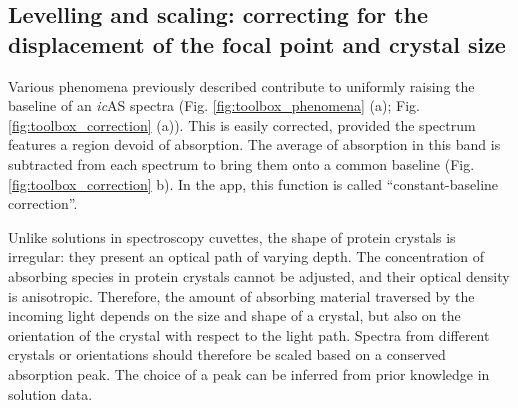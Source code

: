 \subsection{Levelling and scaling: correcting for the displacement of the focal point and crystal size}

Various phenomena previously described contribute to uniformly raising the baseline of an \textit{ic}AS spectra (Fig. \ref{fig:toolbox_phenomena} (a); Fig. \ref{fig:toolbox_correction} (a)). This is easily corrected, provided the spectrum features a region devoid of absorption. The average of absorption in this band is subtracted from each spectrum to bring them onto a common baseline (Fig. \ref{fig:toolbox_correction} b). In the app, this function is called “constant-baseline correction”. 


Unlike solutions in spectroscopy cuvettes, the shape of protein crystals is irregular: they present an optical path of varying depth. The concentration of absorbing species in protein crystals cannot be adjusted, and their optical density is anisotropic. Therefore, the amount of absorbing material traversed by the incoming light depends on the size and shape of a crystal, but also on the orientation of the crystal with respect to the light path. Spectra from different crystals or orientations should therefore be scaled based on a conserved absorption peak. The choice of a peak can be inferred from prior knowledge in solution data. 




